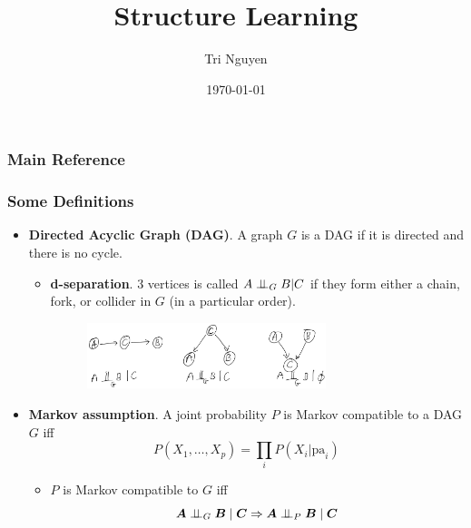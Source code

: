 \documentclass[10pt,xcolor={usenames,dvipsnames,table}]{beamer}
\title{Structure Learning} %
\author{Tri Nguyen} %
\institute[OSU] %
{
    Internal Presentation  \\
Oregon State University  %
}
\date{\today} %
\begin{document}
\frame{\titlepage}

\begin{frame}
    \frametitle{Main Reference}
\end{frame}


\begin{frame}
\frametitle{Some Definitions}
\begin{itemize}
    \item \textbf{Directed Acyclic Graph (DAG)}. A graph $G$ is a DAG if it is directed and there is no cycle. 
        \begin{itemize}
            \item \textbf{d-separation}. 3 vertices is called $A \perp \!\!\! \perp_{G} B | C$ if they form either a chain, fork, or collider in $G$ (in a particular order).
                \begin{figure}
                    \centering
                    \includegraphics[width=0.7\textwidth]{figures/chain_folk_collider.jpg}
                \end{figure}
        \end{itemize}
    \item \textbf{Markov assumption}. A joint probability $P$ is Markov compatible to a DAG $G$ iff
        \[
        P(X_1, \ldots , X_p) = \prod_{i} P(X_i | \text{pa}_i)
        \] 
    \begin{itemize}
    \item $P$ is Markov compatible to  $G$ iff
        \[
        \bm{A} \perp \!\!\! \perp_{G} \bm{B} \mid \bm{C} \Rightarrow \bm{A} \perp \!\!\! \perp_{P} \bm{B} \mid \bm{C}
        \] 
    \end{itemize}
\end{itemize}
\end{frame}
\end{document}
